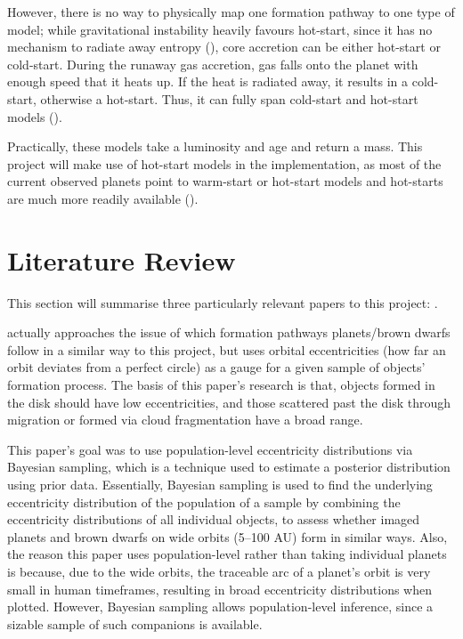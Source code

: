 \documentclass[11pt]{report}
\begin{document}
\begin{mainf}
However, there is no way to physically map one formation pathway to one type of model; while gravitational instability heavily favours hot-start, since it has no mechanism to radiate away entropy (\citealp{Galvagni2012,Bussmann2026}),
core accretion can be either hot-start or cold-start. 
During the runaway gas accretion, gas falls onto the planet with enough speed that it heats up. If the heat is radiated away, it results in a cold-start, otherwise a hot-start. Thus, it can fully span cold-start and hot-start models (\citealp{Berardo2017}).

Practically, these models take a luminosity and age and return a mass. This project will make use of hot-start models in the implementation, as most of the current observed planets point to warm-start or hot-start models and hot-starts are much more readily available (\citealp{Dupuy2021}).


\chapter{Literature Review}\label{chap:litrev}
This section will summarise three particularly relevant papers to this project: \citet{Bowler2020a,Ginski2020,Kuffmeier2026}.

\citet{Bowler2020a} actually approaches the issue of which formation pathways planets/brown dwarfs follow in a similar way to this project, but uses orbital eccentricities (how far an orbit deviates from a perfect circle)
as a gauge for a given sample of objects' formation process. The basis of this paper's research is that, objects formed in the disk should have low eccentricities, and those scattered past the disk through migration or formed via cloud fragmentation have a broad range. 

This paper's goal was to use population-level eccentricity distributions via Bayesian sampling, which is a technique used to estimate a posterior distribution using prior data. Essentially, Bayesian sampling is used to find the underlying eccentricity distribution of the population of a sample by combining the eccentricity distributions of all individual objects, to assess whether imaged planets and brown dwarfs on wide orbits (5--100 AU) form 
in similar ways. Also, the reason this paper uses population-level rather than taking individual planets is because, due to the wide orbits, the traceable arc of a planet's orbit is very small in human timeframes, resulting in broad eccentricity distributions when plotted. However, Bayesian sampling allows population-level inference, since a sizable sample of such 
companions is available.  


\end{mainf}
\end{document}

